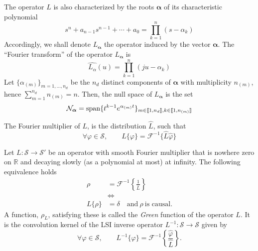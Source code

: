The operator $L$ is also characterized by the roots $\bm{\alpha}$ of its characteristic polynomial
\begin{equation*}
  s^n + a_{n-1}s^{n-1} + \cdots + a_0 = \prod_{k=1}^{n} (s-\alpha_k)
\end{equation*}
Accordingly, we shall denote $L_{\bm{\alpha}}$ the operator induced by the vector $\bm{\alpha}$. The “Fourier transform” 
of the operator $L_{\bm{\alpha}}$ is
\begin{equation*}
  \hat{L_{\alpha}}(u) = \prod_{k=1}^n (ju-\alpha_k)
\end{equation*}
Let $\{\alpha_{(m)}\}_{m=1,\ldots, n_d}$ be the $n_d$ distinct components of $\bm{\alpha}$ with multiplicity $n_{(m)}$, 
hence ${\sum_{m=1}^{n_d} n_{(m)} = n}$. Then, the null space of $L_{\bm{\alpha}}$ is the set~\cite{unser_cardinal_2005}
\begin{equation*}
  \mathcal{N}_{\bm{\alpha}} = \operatorname*{span} \{t^{k-1}e^{\alpha_{(m)}t}\}_{m \in \llbracket1, n_d\rrbracket, k \in \llbracket1, 
  n_{(m)}\rrbracket}
\end{equation*}

The Fourier multiplier of $L$, is the distribution $\hat{L}$, such that 
\begin{equation*}
  \forall \varphi \in \mathcal{S}, \qquad L\{\varphi\} = \mathscr{F}^{-1}\{\hat{L}\hat{\varphi}\}
\end{equation*}

\begin{deftn}\label{def:Green}
  Let $L:\mathcal{S} \to \mathcal{S}'$ be an operator with smooth Fourier multiplier that is nowhere zero on 
  $\mathbb{R}$ and decaying slowly (as a polynomial at most) at infinity. The following equivalence holds
  \begin{align*}
    \rho &= \mathscr{F}^{-1}\left\{\frac{1}{\hat{L}}\right\} \\
    &\iff \\
    L \{\rho\} &= \delta \quad \text{and} \ \rho \ \text{is causal.}
  \end{align*}
  A function, $\rho_L$, satisfying these is called the \emph{Green} function of the operator $L$. It is the convolution 
  kernel of the LSI inverse operator $L^{-1}: \mathcal{S}\to\mathcal{S}$ given by
  \begin{equation*}
    \forall \varphi \in \mathcal{S}, \qquad 
    L^{-1}\{\varphi\}=\mathscr{F}^{-1}\left\{\frac{\hat{\varphi}}{\hat{L}}\right\}.
  \end{equation*}
 \end{deftn}

